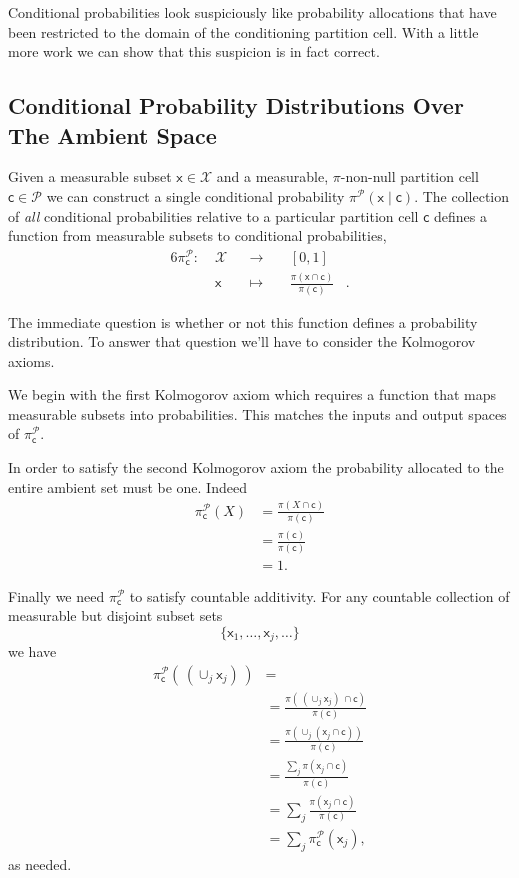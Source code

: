 \documentclass[
  letterpaper,
  DIV=11,
  numbers=noendperiod]{scrartcl}
\begin{document}
Conditional probabilities look suspiciously like probability allocations
that have been restricted to the domain of the conditioning partition
cell. With a little more work we can show that this suspicion is in fact
correct.

\subsection{Conditional Probability Distributions Over The Ambient
Space}\label{conditional-probability-distributions-over-the-ambient-space}

Given a measurable subset \(\mathsf{x} \in \mathcal{X}\) and a
measurable, \(\pi\)-non-null partition cell
\(\mathsf{c} \in \mathcal{P}\) we can construct a single conditional
probability \(\pi^{\mathcal{P}}( \mathsf{x} \mid \mathsf{c})\). The
collection of \emph{all} conditional probabilities relative to a
particular partition cell \(\mathsf{c}\) defines a function from
measurable subsets to conditional probabilities, \begin{alignat*}{6}
\pi^{\mathcal{P}}_{\mathsf{c}}
:\; &\mathcal{X}& &\rightarrow& \; &[0, 1]&
\\
&\mathsf{x} & &\mapsto&
&\frac{ \pi(\mathsf{x} \cap \mathsf{c}) }{ \pi (\mathsf{c}) }&.
\end{alignat*}

The immediate question is whether or not this function defines a
probability distribution. To answer that question we'll have to consider
the Kolmogorov axioms.

We begin with the first Kolmogorov axiom which requires a function that
maps measurable subsets into probabilities. This matches the inputs and
output spaces of \(\pi^{\mathcal{P}}_{\mathsf{c}}\).

In order to satisfy the second Kolmogorov axiom the probability
allocated to the entire ambient set must be one. Indeed \begin{align*}
\pi^{\mathcal{P}}_{\mathsf{c}}( X )
&=
\frac{ \pi(X \cap \mathsf{c}) }{ \pi(\mathsf{c}) }
\\
&=
\frac{ \pi(\mathsf{c}) }{ \pi(\mathsf{c}) }
\\
&=
1.
\end{align*}

Finally we need \(\pi^{\mathcal{P}}_{\mathsf{c}}\) to satisfy countable
additivity. For any countable collection of measurable but disjoint
subset sets \[
\{ \mathsf{x}_{1}, \ldots, \mathsf{x}_{j}, \ldots \}
\] we have \begin{align*}
\pi^{\mathcal{P}}_{\mathsf{c}}( \, (\cup_{j} \mathsf{x}_{j}) \, )
&=
\\
&=
\frac{ \pi( \, (\cup_{j} \mathsf{x}_{j}) \, \cap \mathsf{c}) }
{ \pi(\mathsf{c}) }
\\
&=
\frac{ \pi( \cup_{j} (\mathsf{x}_{j} \cap \mathsf{c}) ) }
{ \pi(\mathsf{c}) }
\\
&=
\frac{ \sum_{j} \pi( \mathsf{x}_{j} \cap \mathsf{c} ) }
{ \pi(\mathsf{c}) }
\\
&=
\sum_{j} \frac{ \pi( \mathsf{x}_{j} \cap \mathsf{c} ) }
{ \pi(\mathsf{c}) }
\\
&=
\sum_{j} \pi^{\mathcal{P}}_{\mathsf{c}}( \mathsf{x}_{j} ),
\end{align*} as needed.
\end{document}
